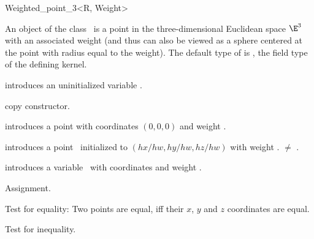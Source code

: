 \begin{ccRefClass} {Weighted_point_3<R, Weight>}

\ccDefinition
An object of the class \ccRefName\ is a point in the three-dimensional
Euclidean space $\E^3$ with an associated weight (and thus can also be 
viewed as a sphere centered at the point with radius equal to the weight). 
The default type of  is , the
field type of the defining kernel.

\ccInheritsFrom
{}

\ccTypes


\ccCreation
{}


\ccHidden {}
             {introduces an uninitialized variable \ccVar.}

\ccHidden {}
 	    {copy constructor.}

 	    {introduces a point with  
             coordinates $(0,0,0)$ and weight .}

            {introduces a point \ccVar\ initialized to $(hx/hw,hy/hw, hz/hw)$
             with weight .
	     \ccPrecond {} $\neq$ .}

            {introduces a variable \ccVar\ with 
             coordinates  and weight .}

\ccOperations

\ccHidden {}
        {Assignment.}

       {Test for equality: Two points are equal, iff their $x$, $y$ and $z$
        coordinates are equal.}

       {Test for inequality.}




\end{ccRefClass}
